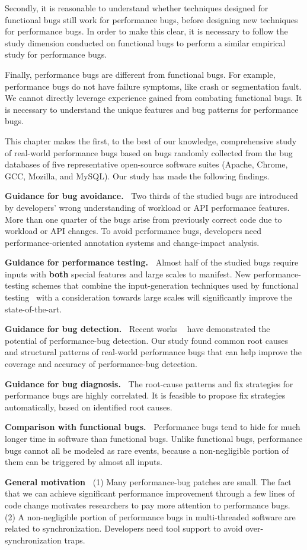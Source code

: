 Secondly, it is reasonable to understand whether techniques designed for functional bugs still work for performance bugs, 
before designing new techniques for performance bugs. 
In order to make this clear, 
it is necessary to follow the study dimension conducted on functional 
bugs to perform a similar empirical study for performance bugs. 

Finally, performance bugs are different from functional bugs. 
For example, performance bugs do not have failure symptoms, 
like crash or segmentation fault. 
We cannot directly leverage experience gained from combating functional bugs. 
It is necessary to understand the unique features and bug patterns for performance bugs.

This chapter makes the first, to the best of our knowledge,
comprehensive study of real-world performance bugs
based on \allbugs bugs randomly collected from the bug databases of five
representative open-source software suites (Apache, Chrome, GCC,
Mozilla, and MySQL). Our study has made the following findings.

{\bf Guidance for bug avoidance.\ }
Two thirds of the studied bugs are
introduced by developers' wrong understanding of workload
or API performance features.  
More than one quarter of the bugs arise from previously correct
code due to workload or API changes. 
To avoid performance bugs,
developers need performance-oriented
annotation systems and change-impact analysis.

{\bf Guidance for performance testing.\ } 
Almost half of the studied bugs require inputs with {\bf both} {special}
features and large scales to manifest. 
New performance-testing schemes that combine the input-generation techniques 
used by functional testing~\citep{KLEE,dart} with a consideration towards large 
scales will significantly improve the state-of-the-art.

{\bf Guidance for bug detection.\ } Recent works
~\citep{s2e,BloatFSE2008,perf.fse10,jolt,XuBloatPLDI2009,XuBloatPLDI2010}
have demonstrated the potential of performance-bug detection. 
Our study found common root causes and structural patterns of real-world
performance bugs that can help improve the coverage and accuracy 
of performance-bug detection.

{\bf Guidance for bug diagnosis.\ } 
The root-cause patterns and fix strategies for performance bugs are 
highly correlated. It is feasible to propose fix strategies automatically, based on identified root causes. 

{\bf Comparison with functional bugs.\ }
Performance bugs tend to hide for much longer time in software 
than functional bugs.
Unlike functional bugs, performance
bugs cannot all be modeled as rare events, because a 
non-negligible portion of them can be triggered by
almost all inputs.

{\bf General motivation\ }
(1) Many performance-bug patches are small.  The fact that we can
achieve significant performance
improvement through a few lines of code change motivates
researchers to pay more attention to performance bugs.
(2) A non-negligible portion of performance bugs in multi-threaded
software are related to synchronization.
Developers need tool support to avoid over-synchronization traps.
